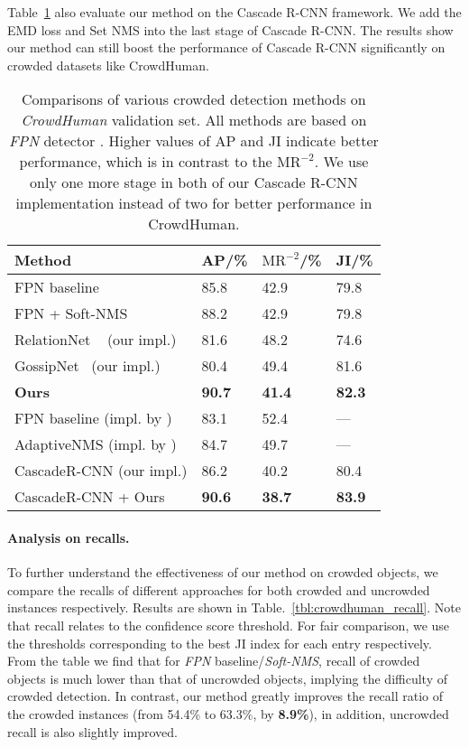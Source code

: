 \documentclass[10pt,twocolumn,letterpaper]{article}
\begin{document}
Table~\ref{tbl:crowdhuman_comp} also evaluate our method on the Cascade R-CNN \cite{cai2019cascadercnn} framework. 
We add the EMD loss and Set NMS into the last stage of Cascade R-CNN.
The results show our method can still boost the performance of Cascade R-CNN significantly on crowded datasets like CrowdHuman.
\begin{table}[ht]
   \centering
   \begin{tabular}{p{44mm}|p{6mm}<{\centering}p{10mm}<{\centering}p{6mm}<{\centering}}
   \toprule
       Method & AP/\% & $\text{MR}^{-2}$/\%  & JI/\% \\
       \hline
      FPN baseline & 85.8 & 42.9 & 79.8 \\
      FPN + Soft-NMS \cite{softnms} & 88.2 & 42.9 & 79.8 \\
       \hline
       RelationNet ~\cite{hu2017relation} (our impl.) & 81.6 & 48.2 & 74.6 \\
       GossipNet~\cite{learningnms}  (our impl.) &  80.4 & 49.4 & 81.6  \\
       \hline
       \textbf{Ours} & \textbf{90.7} & \textbf{41.4} & \textbf{82.3} \\
       \hline
       \hline
       FPN baseline (impl. by \cite{adaptiveNMS}) & 83.1 & 52.4 & --- \\
       AdaptiveNMS (impl. by \cite{adaptiveNMS}) & 84.7 & 49.7 & --- \\
       \hline
       \hline
       CascadeR-CNN \cite{cai2019cascadercnn} (our impl.) & 86.2 & 40.2 & 80.4 \\
       CascadeR-CNN + Ours & \textbf{90.6} & \textbf{38.7} & \textbf{83.9} \\
       \bottomrule
   \end{tabular}
   \caption{Comparisons of various crowded detection methods on \emph{CrowdHuman} validation set. All methods are based on \emph{FPN} detector \cite{lin2017feature}. Higher values of AP and JI indicate better performance, which is in contrast to the $\text{MR}^{-2}$.
      We use only one more stage in both of our Cascade R-CNN implementation instead of two for better performance in CrowdHuman.}
   \label{tbl:crowdhuman_comp}
\end{table}

\paragraph{Analysis on recalls.}
To further understand the effectiveness of our method on crowded objects, we compare the recalls of different approaches for both crowded and uncrowded instances respectively. Results are shown in Table.~\ref{tbl:crowdhuman_recall}. Note that recall relates to the confidence score threshold. For fair comparison, we use the thresholds corresponding to the best JI index for each entry respectively. From the table we find that for \emph{FPN} baseline/\emph{Soft-NMS}, recall of crowded objects is much lower than that of uncrowded objects, implying the difficulty of crowded detection. In contrast, our method greatly improves the recall ratio of the crowded instances (from 54.4\% to 63.3\%, by \textbf{8.9\%}), in addition, uncrowded recall is also slightly improved. 
\end{document}
